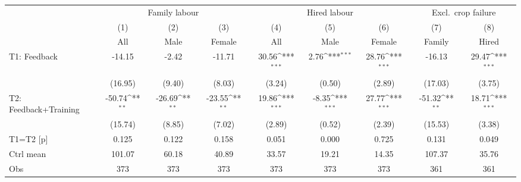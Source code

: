 {
\def\sym#1{\ifmmode^{#1}\else\(^{#1}\)\fi}
\begin{tabular}{l*{8}{c}}
\toprule
                    &\multicolumn{3}{c}{Family labour}                                &\multicolumn{3}{c}{Hired labour}                                 &\multicolumn{2}{c}{Excl.\ crop failure}    \\\cmidrule(lr){2-4}\cmidrule(lr){5-7}\cmidrule(lr){8-9}
                    &\multicolumn{1}{c}{(1)}&\multicolumn{1}{c}{(2)}&\multicolumn{1}{c}{(3)}&\multicolumn{1}{c}{(4)}&\multicolumn{1}{c}{(5)}&\multicolumn{1}{c}{(6)}&\multicolumn{1}{c}{(7)}&\multicolumn{1}{c}{(8)}\\
                    &\multicolumn{1}{c}{All}&\multicolumn{1}{c}{Male}&\multicolumn{1}{c}{Female}&\multicolumn{1}{c}{All}&\multicolumn{1}{c}{Male}&\multicolumn{1}{c}{Female}&\multicolumn{1}{c}{Family}&\multicolumn{1}{c}{Hired}\\
\midrule
T1: Feedback        &      -14.15         &       -2.42         &      -11.71         &       30.56\sym{***}&        2.76\sym{***}&       28.76\sym{***}&      -16.13         &       29.47\sym{***}\\
                    &     (16.95)         &      (9.40)         &      (8.03)         &      (3.24)         &      (0.50)         &      (2.89)         &     (17.03)         &      (3.75)         \\
T2: Feedback+Training&      -50.74\sym{**} &      -26.69\sym{**} &      -23.55\sym{**} &       19.86\sym{***}&       -8.35\sym{***}&       27.77\sym{***}&      -51.32\sym{**} &       18.71\sym{***}\\
                    &     (15.74)         &      (8.85)         &      (7.02)         &      (2.89)         &      (0.52)         &      (2.39)         &     (15.53)         &      (3.38)         \\
\midrule
T1=T2 [p]           &       0.125         &       0.122         &       0.158         &       0.051         &       0.000         &       0.725         &       0.131         &       0.049         \\
Ctrl mean           &      101.07         &       60.18         &       40.89         &       33.57         &       19.21         &       14.35         &      107.37         &       35.76         \\
Obs                 &         373         &         373         &         373         &         373         &         373         &         373         &         361         &         361         \\
\bottomrule
\end{tabular}
}
